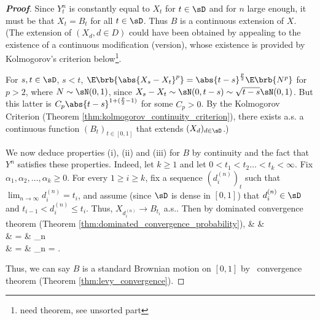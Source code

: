 \begin{proof}[\bf Proof]
Since $Y^n_t$ is constantly equal to $X_t$ for $t \in \sD$ and for $n$ large enough, it must be that $X_t = B_t$ for all $t \in \sD$. Thus $B$ is a continuous extension of $X$. (The extension of $(X_d, d \in D)$ could have been obtained by appealing to the existence of a continuous modification (version), whose existence is provided by Kolmogorov's criterion below\footnote{need theorem, see unsorted part}.%

For $s, t \in \sD$, $s < t$, $\E\brb{\abs{X_s-X_t }^p} = \abs{t-s}^{\frac p2} \E\brb{N^p}$ for $p > 2$, where $N \sim \sN (0, 1)$, since $X_s - X_t \sim \sN (0, t -s) \sim \sqrt{t -s}\sN (0, 1)$. But this latter is $C_p\abs{t -s}^{1+(\frac p2 -1)}$ for some $C_p > 0$. By the Kolmogorov Criterion (Theorem \ref{thm:kolmogorov_continuity_criterion}), there exists a.s. a continuous function $(B_t)_{t\in [0,1]}$ that extends $(X_d)_{d\in \sD}$.) %


We now deduce properties (i), (ii) and (iii) for $B$ by continuity and the fact that $Y^n$ satisfies these properties. Indeed, let $k \geq 1$ and let $0 < t_1 < t_2 \dots < t_k < \infty$. Fix $\alpha_1, \alpha_2,\dots, \alpha_k \geq 0$. For every $1 \geq i \geq k$, fix a sequence $(d^{(n)}_i)_t$ such that $\lim_{n\to \infty} d^{(n)}_i = t_i$, and assume (since $\sD$ is dense in $[0, 1]$) that $d^{(n)}_i\in \sD$ and $t_{i-1} < d^{(n)}_i \leq t_i$. Thus, $X_{d^{(n)}_i} \to B_{t_i}$ a.s.. Then by dominated convergence theorem (Theorem \ref{thm:dominated_convergence_probability}),
\beast
& & \E{}\\
& = & \lim_{n\to \infty} \E{}\\
& = & \lim_{n\to \infty} \exp{} = \exp{}.
\eeast

Thus, we can say $B$ is a standard Brownian motion on $[0,1]$ by \levy\ convergence theorem (Theorem \ref{thm:levy_convergence}).


\end{proof}
